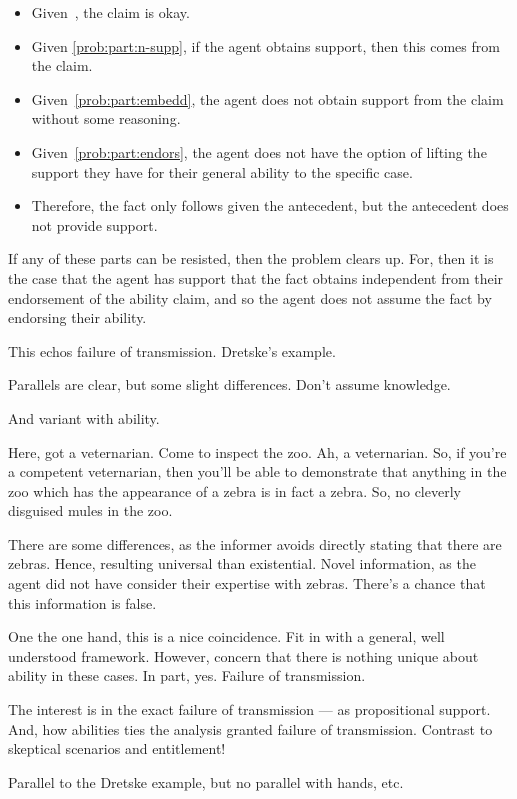 \documentclass[10pt]{article}
\begin{document}
\begin{itemize}
\item Given~\label{prob:part:condit}, the claim is okay.
\item Given \ref{prob:part:n-supp}, if the agent obtains support, then this comes from the claim.
\item Given~\ref{prob:part:embedd}, the agent does not obtain support from the claim without some reasoning.
\item Given~\ref{prob:part:endors}, the agent does not have the option of lifting the support they have for their general ability to the specific case.
\item Therefore, the fact only follows given the antecedent, but the antecedent does not provide support.
\end{itemize}

If any of these parts can be resisted, then the problem clears up.
For, then it is the case that the agent has support that the fact obtains independent from their endorsement of the ability claim, and so the agent does not assume the fact by endorsing their ability.


\begin{note}[Transmission]
  This echos failure of transmission.
  Dretske's example.


  Parallels are clear, but some slight differences.
  Don't assume knowledge.
  

  And variant with ability.

  Here, got a veternarian.
  Come to inspect the zoo.
  Ah, a veternarian.
  So, if you're a competent veternarian, then you'll be able to demonstrate that anything in the zoo which has the appearance of a zebra is in fact a zebra.
  So, no cleverly disguised mules in the zoo.

  There are some differences, as the informer avoids directly stating that there are zebras.
  Hence, resulting universal than existential.
  Novel information, as the agent did not have consider their expertise with zebras.
  There's a chance that this information is false.
  
  

  One the one hand, this is a nice coincidence.
  Fit in with a general, well understood framework.
  However, concern that there is nothing unique about ability in these cases.
  In part, yes.
  Failure of transmission.

  The interest is in the exact failure of transmission --- as propositional support.
  And, how abilities ties the analysis granted failure of transmission.
  Contrast to skeptical scenarios and entitlement!

  Parallel to the Dretske example, but no parallel with hands, etc.
\end{note}
\end{document}
